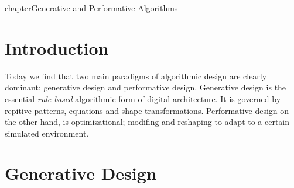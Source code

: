 chapter{Generative and Performative Algorithms}

\section{Introduction}

Today we find that two main paradigms of algorithmic design are clearly dominant; generative design and performative design. Generative design is the essential \emph{rule-based} algorithmic form of digital architecture. It is governed by repitive patterns, equations and shape transformations.  Performative design on the other hand, is optimizational; modifing and reshaping to adapt to a certain simulated environment.

\section{Generative Design}
